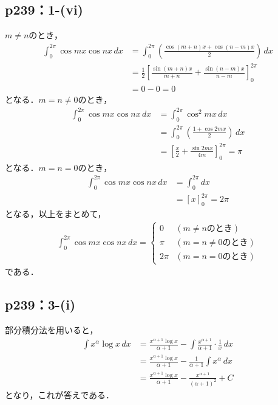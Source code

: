 \documentclass[uplatex,dvipdfmx,a4paper,10pt,fleqn]{jsarticle}
\begin{document}
\subsection*{p239：1-(vi)}
	\begin{screen}
		$m \ne n$のとき，
		\begin{align*}
			\int_{0}^{2\pi} \cos mx \cos nx \, dx & = \int_{0}^{2\pi} \left (\frac{\cos(m+n)x+\cos(n-m)x}{2}\right) \, dx\\
			& = \frac{1}{2} \left [\frac{\sin (m+n)x}{m+n}+\frac{\sin(n-m)x}{n-m}\right]_{0}^{2\pi} \\
			& = 0-0 =0
		\end{align*}
		となる．$m =n \ne 0$のとき，
		\begin{align*}
			\int_{0}^{2\pi} \cos mx \cos nx \, dx & = \int_{0}^{2\pi} \cos^2 mx \, dx \\
			& = \int_{0}^{2\pi} \left (\frac{1+\cos 2mx}{2}\right) \, dx  \\
			& = \left [\frac{x}{2}+\frac{\sin 2mx}{4m}\right]_{0}^{2\pi} = \pi
		\end{align*}
		となる．$m =n =0$のとき，
		\begin{align*}
			\int_{0}^{2\pi} \cos mx \cos nx \, dx & = \int_{0}^{2\pi} dx \\
			& = [x]_{0}^{2\pi} = 2\pi
		\end{align*}
		となる，以上をまとめて，
		\begin{align*}
			\int_{0}^{2\pi} \cos mx \cos nx \, dx =
			\begin{cases}
				0 & (m \ne n のとき)\\
				\pi & (m = n\ne 0のとき)\\
				2 \pi & (m=n=0 のとき)
			\end{cases}
		\end{align*}
		である．
	\end{screen}

    \subsection*{p239：3-(i)}

\begin{tleftbar}
    部分積分法を用いると，
    \begin{align*}
        \int x^\alpha \log x \, dx & = \frac{x^{\alpha +1} \log x}{\alpha +1}　- \int \frac{x^{\alpha +1}}{\alpha+1} \cdot \frac{1}{x} \, dx \\
        & = \frac{x^{\alpha +1} \log x}{\alpha +1}- \frac{1}{\alpha +1} \int x^{\alpha} \, dx \\
        & = \frac{x^{\alpha+1} \log x}{\alpha +1} - \frac{x^{\alpha +1}}{(\alpha +1)^2}+ C
    \end{align*}
    となり，これが答えである．
\end{tleftbar}
\end{document}
